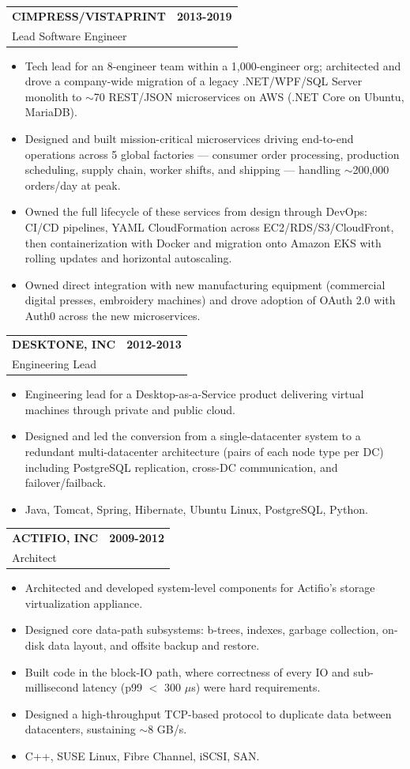 \documentclass[11pt]{article}
\makeatletter
\newcommand{\jobheading}[4]{%
  \vspace{4pt}\begin{tabularx}{\textwidth}{@{}X r@{}}
    {\textbf{#1}} & {\textbf{#2}} \\
    {{\normalsize #3}\hspace{0.5em}{\color{muted}·}\hspace{0.5em}{\color{muted}#4}} & {} \\
  \end{tabularx}\vspace{0pt}
}
\makeatother
\begin{document}
\jobheading{CIMPRESS/VISTAPRINT}{2013-2019}{Lead Software Engineer}{Waltham, MA}
\begin{itemize}
\item Tech lead for an 8-engineer team within a 1,000-engineer org; architected and drove a company-wide migration of a legacy .NET/WPF/SQL Server monolith to $\sim$70 REST/JSON microservices on AWS (.NET Core on Ubuntu, MariaDB).
\item Designed and built mission-critical microservices driving end-to-end operations across 5 global factories --- consumer order processing, production scheduling, supply chain, worker shifts, and shipping --- handling $\sim$200{,}000 orders/day at peak.
\item Owned the full lifecycle of these services from design through DevOps: CI/CD pipelines, YAML CloudFormation across EC2/RDS/S3/CloudFront, then containerization with Docker and migration onto Amazon EKS with rolling updates and horizontal autoscaling.
\item Owned direct integration with new manufacturing equipment (commercial digital presses, embroidery machines) and drove adoption of OAuth 2.0 with Auth0 across the new microservices.
\end{itemize}

\jobheading{DESKTONE, INC}{2012-2013}{Engineering Lead}{Lexington, MA}
\begin{itemize}
\item Engineering lead for a Desktop-as-a-Service product delivering virtual machines through private and public cloud.
\item Designed and led the conversion from a single-datacenter system to a redundant multi-datacenter architecture (pairs of each node type per DC) including PostgreSQL replication, cross-DC communication, and failover/failback.
\item Java, Tomcat, Spring, Hibernate, Ubuntu Linux, PostgreSQL, Python.
\end{itemize}

\jobheading{ACTIFIO, INC}{2009-2012}{Architect}{Waltham, MA}
\begin{itemize}
\item Architected and developed system-level components for Actifio's storage virtualization appliance.
\item Designed core data-path subsystems: b-trees, indexes, garbage collection, on-disk data layout, and offsite backup and restore.
\item Built code in the block-IO path, where correctness of every IO and sub-millisecond latency (p99 $<$ 300 $\mu$s) were hard requirements.
\item Designed a high-throughput TCP-based protocol to duplicate data between datacenters, sustaining $\sim$8 GB/s.
\item C++, SUSE Linux, Fibre Channel, iSCSI, SAN.
\end{itemize}
\end{document}
